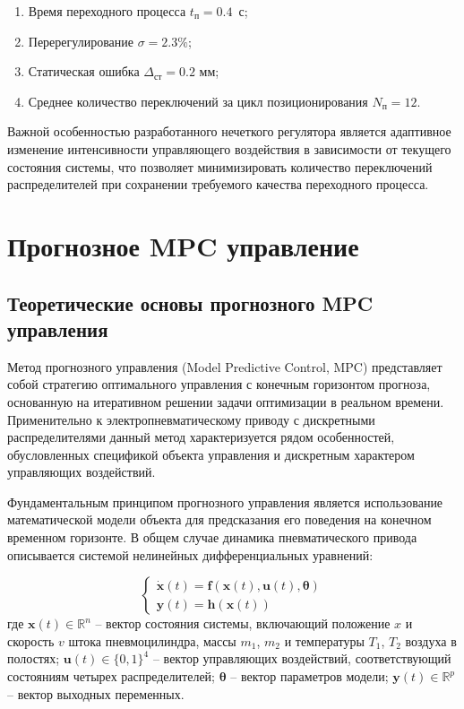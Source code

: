 \begin{enumerate}
\item Время переходного процесса $t_п = \num{0.4}$~с;
\item Перерегулирование $\sigma = \num{2.3}\%$;
\item Статическая ошибка $\Delta_{\text{ст}} = \num{0.2}$ мм;
\item Среднее количество переключений за цикл позиционирования $N_\text{п} = 12$.
\end{enumerate}

Важной особенностью разработанного нечеткого регулятора является адаптивное изменение интенсивности управляющего воздействия в зависимости от текущего состояния системы, что позволяет минимизировать количество переключений распределителей при сохранении требуемого качества переходного процесса.

\section{Прогнозное MPC управление}\label{sec:ch3/sec5}

\subsection{Теоретические основы прогнозного MPC управления}\label{subsec:ch3/sec5/sub1}

Метод прогнозного управления (Model Predictive Control, MPC) представляет собой стратегию
оптимального управления с конечным горизонтом прогноза, основанную на итеративном решении задачи оптимизации в
реальном времени. Применительно к электропневматическому приводу с
дискретными распределителями данный метод характеризуется рядом особенностей, обусловленных
спецификой объекта управления и дискретным характером управляющих воздействий.

Фундаментальным принципом прогнозного управления является использование математической модели
объекта для предсказания его поведения на конечном временном горизонте. В общем случае
динамика пневматического привода описывается системой нелинейных дифференциальных уравнений:

\begin{equation}
\begin{cases}
\dot{\mathbf{x}}(t) = \mathbf{f}(\mathbf{x}(t), \mathbf{u}(t), \boldsymbol{\theta}) \\
\mathbf{y}(t) = \mathbf{h}(\mathbf{x}(t))
\end{cases}
\end{equation}
где $\mathbf{x}(t) \in \mathbb{R}^n$ -- вектор состояния системы, включающий положение $x$ и скорость $v$ штока пневмоцилиндра, массы $m_1$, $m_2$ и температуры $T_1$, $T_2$ воздуха в полостях;
$\mathbf{u}(t) \in \{0,1\}^4$ -- вектор управляющих воздействий, соответствующий состояниям четырех распределителей;
$\boldsymbol{\theta}$ -- вектор параметров модели;
$\mathbf{y}(t) \in \mathbb{R}^p$ -- вектор выходных переменных.

